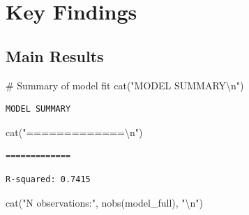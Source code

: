 \documentclass[
  11pt,
]{article}
\newenvironment{Shaded}{\begin{snugshade}}{\end{snugshade}}
\newcommand{\CommentTok}[1]{\textcolor[rgb]{0.37,0.37,0.37}{#1}}
\newcommand{\DecValTok}[1]{\textcolor[rgb]{0.68,0.00,0.00}{#1}}
\newcommand{\FunctionTok}[1]{\textcolor[rgb]{0.28,0.35,0.67}{#1}}
\newcommand{\NormalTok}[1]{\textcolor[rgb]{0.00,0.23,0.31}{#1}}
\newcommand{\SpecialCharTok}[1]{\textcolor[rgb]{0.37,0.37,0.37}{#1}}
\newcommand{\StringTok}[1]{\textcolor[rgb]{0.13,0.47,0.30}{#1}}
\begin{document}
\section{Key Findings}\label{key-findings}

\subsection{Main Results}\label{main-results}

\begin{Shaded}
\begin{Highlighting}[]
\CommentTok{\# Summary of model fit}
\FunctionTok{cat}\NormalTok{(}\StringTok{"MODEL SUMMARY}\SpecialCharTok{\textbackslash{}n}\StringTok{"}\NormalTok{)}
\end{Highlighting}
\end{Shaded}

\begin{verbatim}
MODEL SUMMARY
\end{verbatim}

\begin{Shaded}
\begin{Highlighting}[]
\FunctionTok{cat}\NormalTok{(}\StringTok{"=============}\SpecialCharTok{\textbackslash{}n}\StringTok{"}\NormalTok{)}
\end{Highlighting}
\end{Shaded}

\begin{verbatim}
=============
\end{verbatim}

\begin{Shaded}
\end{Shaded}

\begin{verbatim}
R-squared: 0.7415 
\end{verbatim}

\begin{Shaded}
\begin{Highlighting}[]
\FunctionTok{cat}\NormalTok{(}\StringTok{"N observations:"}\NormalTok{, }\FunctionTok{nobs}\NormalTok{(model\_full), }\StringTok{"}\SpecialCharTok{\textbackslash{}n}\StringTok{"}\NormalTok{)}
\end{Highlighting}
\end{Shaded}
\end{document}
